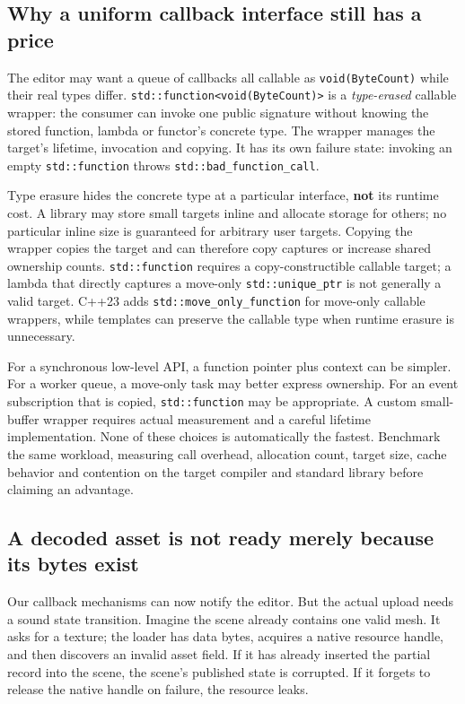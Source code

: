 \subsection{Why a uniform callback interface still has a price}\label{05-engine-i-ch004-why-a-uniform-callback-interface-still-has-a-price}

The editor may want a queue of callbacks all callable as \texttt{void(ByteCount)} while their real types differ. \texttt{std::function\textless{}void(ByteCount)\textgreater{}} is a \emph{type-erased} callable wrapper: the consumer can invoke one public signature without knowing the stored function, lambda or functor's concrete type. The wrapper manages the target's lifetime, invocation and copying. It has its own failure state: invoking an empty \texttt{std::function} throws \texttt{std::bad\_function\_call}.

Type erasure hides the concrete type at a particular interface, \textbf{not} its runtime cost. A library may store small targets inline and allocate storage for others; no particular inline size is guaranteed for arbitrary user targets. Copying the wrapper copies the target and can therefore copy captures or increase shared ownership counts. \texttt{std::function} requires a copy-constructible callable target; a lambda that directly captures a move-only \texttt{std::unique\_ptr} is not generally a valid target. C++23 adds \texttt{std::move\_only\_function} for move-only callable wrappers, while templates can preserve the callable type when runtime erasure is unnecessary.

For a synchronous low-level API, a function pointer plus context can be simpler. For a worker queue, a move-only task may better express ownership. For an event subscription that is copied, \texttt{std::function} may be appropriate. A custom small-buffer wrapper requires actual measurement and a careful lifetime implementation. None of these choices is automatically the fastest. Benchmark the same workload, measuring call overhead, allocation count, target size, cache behavior and contention on the target compiler and standard library before claiming an advantage.

\subsection{A decoded asset is not ready merely because its bytes exist}\label{05-engine-i-ch004-a-decoded-asset-is-not-ready-merely-because-its-bytes-exist}

Our callback mechanisms can now notify the editor. But the actual upload needs a sound state transition. Imagine the scene already contains one valid mesh. It asks for a texture; the loader has data bytes, acquires a native resource handle, and then discovers an invalid asset field. If it has already inserted the partial record into the scene, the scene's published state is corrupted. If it forgets to release the native handle on failure, the resource leaks.

